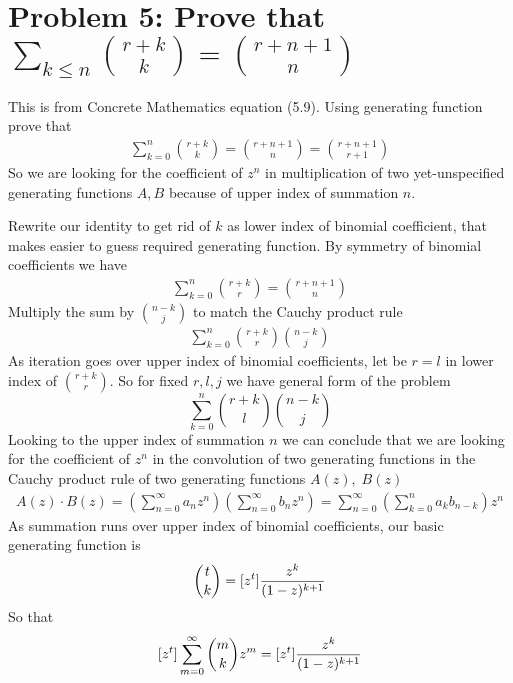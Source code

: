 ﻿\section{Problem 5: Prove that $\sum_{k \leq n} \binom{r+k}{k} = \binom{r+n+1}{n}$}
\label{sec:problem-5:-concrete-mathematics-5.9}
This is from Concrete Mathematics equation (5.9).
Using generating function prove that
\begin{align}
    \sum_{k=0}^{n} \binom{r+k}{k} = \binom{r+n+1}{n} = \binom{r+n+1}{r+1}
    \label{eq:identity-to-prove-problem-5}
\end{align}
So we are looking for the coefficient of $z^n$ in multiplication
of two yet-unspecified generating functions $A, B$ because of upper index of summation $n$.


Rewrite our identity to get rid of $k$ as lower index of binomial coefficient,
that makes easier to guess required generating function.
By symmetry of binomial coefficients we have
\begin{align*}
    \sum_{k=0}^{n} \binom{r+k}{r} = \binom{r+n+1}{n}
\end{align*}
Multiply the sum by $\binom{n-k}{j}$ to match the Cauchy product rule
\begin{align*}
    \sum_{k=0}^{n} \binom{r+k}{r} \binom{n-k}{j}
\end{align*}
As iteration goes over upper index of binomial coefficients, let be $r=l$ in
lower index of $\binom{r+k}{r}$.
So for fixed $r, l, j$ we have general form of the problem
\begin{equation}
    \sum_{k=0}^{n} \binom{r+k}{l} \binom{n-k}{j}
    \label{eq:problem-5-general-form}
\end{equation}
Looking to the upper index of summation $n$ we can conclude that we are looking for
the coefficient of $z^n$ in the convolution of two generating functions in the
Cauchy product rule of two generating functions $A(z), \; B(z)$
\begin{align*}
    A(z) \cdot B(z) = \left( \sum_{n=0}^{\infty} a_n z^n \right) \left( \sum_{n=0}^{\infty} b_n z^n \right)
    = \sum_{n=0}^{\infty} \left( \sum_{k=0}^{n} a_k b_{n-k} \right) z^n
\end{align*}
As summation runs over upper index of binomial coefficients, our basic generating function is
\begin{align*}
    \binom{t}{k} = [z^{t}] \frac{z^k}{(1-z)^{k+1}}
\end{align*}
So that
\begin{align*}
    [z^{t}] \sum_{m=0}^{\infty} \binom{m}{k} z^m = [z^{t}] \frac{z^k}{(1-z)^{k+1}}
\end{align*}
